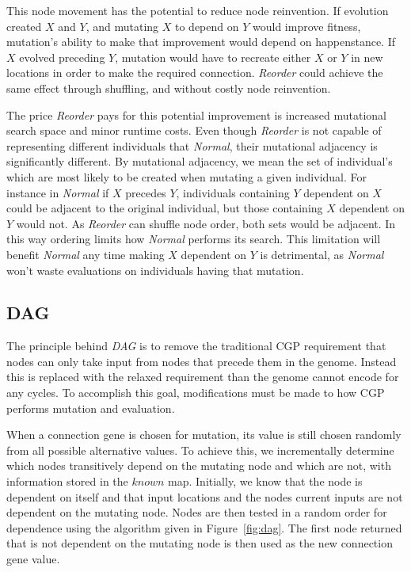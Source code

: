\documentclass[journal]{IEEEtran}
\begin{document}
This node movement has the potential to reduce node reinvention.  If evolution created
$X$ and $Y$, and mutating $X$ to depend on $Y$ would improve fitness, mutation's
ability to make that improvement would depend on happenstance.  If $X$ evolved
preceding $Y$, mutation would have to recreate either $X$ or $Y$ in new locations
in order to make the required connection.  \emph{Reorder} could achieve the same
effect through shuffling, and without costly node reinvention.

The price \emph{Reorder} pays for this potential improvement is increased mutational search
space and minor runtime costs.  Even though \emph{Reorder} is not capable of representing
different individuals that \emph{Normal}, their mutational adjacency is significantly different.
By mutational adjacency, we mean the set of individual's which are most likely to be created
when mutating a given individual.  For instance in \emph{Normal} if $X$ precedes $Y$, individuals
containing $Y$ dependent on $X$ could be adjacent to the original individual, but those containing
$X$ dependent on $Y$ would not.  As \emph{Reorder} can shuffle node order, both sets would be
adjacent.  In this way ordering limits how \emph{Normal} performs its search.  This limitation
will benefit \emph{Normal} any time making $X$ dependent on $Y$ is detrimental, as
\emph{Normal} won't waste evaluations on individuals having that mutation.


\subsection{DAG}
The principle behind \emph{DAG} is to remove the traditional CGP requirement that
nodes can only take input from nodes that precede them in the genome.  Instead
this is replaced with the relaxed requirement than the genome cannot encode for
any cycles.  To accomplish this goal, modifications must be made to how CGP
performs mutation and evaluation.

When a connection gene is chosen for mutation, its value is still chosen randomly
from all possible alternative values.  To achieve this, we incrementally determine
which nodes transitively depend on the mutating node and which are not, with
information stored in the $known$ map.  Initially, we know that the node
is dependent on itself and that input locations and the nodes current inputs
are not dependent on the mutating node.  Nodes are then
tested in a random order for dependence using the algorithm given in Figure~\ref{fig:dag}.
The first node returned that is not dependent on the mutating node is then
used as the new connection gene value.
\end{document}
